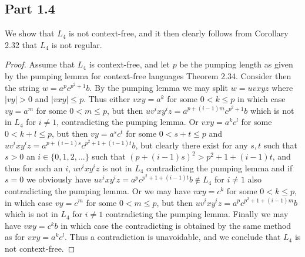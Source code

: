 \documentclass[a4paper,11pt]{article}
\newcommand{\abs}[1]{\left\lvert #1 \right\rvert}
\numberwithin{equation}{section}
\begin{document}
	\subsection*{Part 1.4}
	We show that $ L_4 $ is not context-free, and it then clearly follows from Corollary 2.32 that $ L_4 $ is not regular.
	\begin{proof}
		Assume that $ L_4 $ is context-free, and let $ p $ be the pumping length as given by the pumping lemma for context-free languages Theorem 2.34. Consider then the string $ w=a^pc^{p^2+1}b $. By the pumping lemma we may split $ w=uvxyz $ where $ \abs{vy}>0 $ and $ \abs{vxy}\leq p $. Thus either $ vxy=a^k $ for some $ 0<k\leq p $ in which case $ vy=a^m $ for some $ 0<m\leq p $, but then $ uv^ixy^iz=a^{p+(i-1)m}c^{p^2+1}b $ which is not in $ L_4 $ for $ i\neq 1 $, contradicting the pumping lemma. Or $ vxy=a^kc^l $ for some $ 0<k+l\leq p $, but then $ vy=a^sc^t $ for some $  0<s+t\leq p  $ and $ uv^ixy^iz=a^{p+(i-1)s}c^{p^2+1+(i-1)t}b  $, but clearly there exist for any $ s,t $ such that $ s>0 $ an $ i\in\{0,1,2,...\} $ such that $ (p+(i-1)s)^2>p^2+1+(i-1)t $, and thus for such an $ i $, $ uv^ixy^iz $ is not in $ L_4 $ contradicting the pumping lemma and if $ s=0 $ we obviously have $ uv^ixy^iz=a^{p}c^{p^2+1+(i-1)t}b \notin L_4 $ for $ i\neq1 $ also contradicting the pumping lemma. Or we may have $ vxy=c^k $ for some $ 0<k\leq p $, in which case $ vy=c^m $ for some $ 0<m\leq p $, but then $ uv^ixy^iz=a^pc^{p^2+1+(i-1)m}b $ which is not in $ L_4 $ for $ i\neq 1 $ contradicting the pumping lemma. Finally we may have $ vxy=c^kb $ in which case the contradicting is obtained by the same method as for $ vxy=a^kc^l $. Thus a contradiction is unavoidable, and we conclude that $ L_4 $ is not context-free.
	\end{proof}
	
\end{document}
